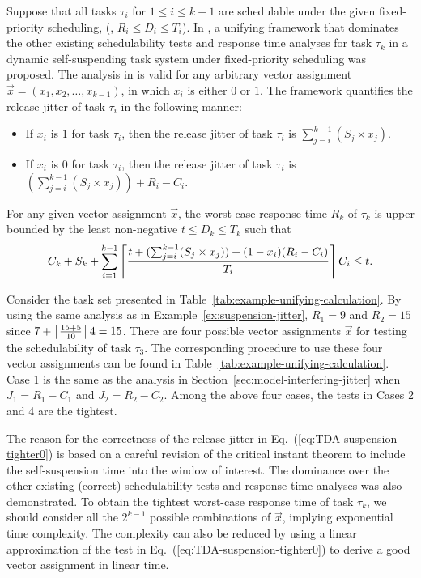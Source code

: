   Suppose that all tasks $\tau_i$ for $1 \leq i \leq k-1$ are
  schedulable under the given fixed-priority scheduling, (\ie, $R_i
  \leq D_i \leq T_i$). In \cite{ChenECRTS2016-suspension}, a unifying framework that dominates the other existing
  schedulability tests and response time analyses for task $\tau_k$ in
  a dynamic self-suspending task system under fixed-priority
  scheduling was proposed. The analysis in \cite{ChenECRTS2016-suspension} is valid
  for any arbitrary vector assignment $\vec{x} = (x_1, x_2, \ldots,
  x_{k-1})$, in which $x_i$ is either $0$ or $1$. The framework
  quantifies the release jitter of task $\tau_i$ in the following
  manner:
  \begin{itemize}
  \item If $x_i$ is $1$ for task $\tau_i$, then the release jitter of
    task $\tau_i$ is $\sum_{j=i}^{k-1} (S_j \times x_j)$. 
  \item If $x_i$ is $0$ for task $\tau_i$, then the release jitter of
    task $\tau_i$ is $(\sum_{j=i}^{k-1} (S_j \times x_j)) + R_i-C_i$. 
  \end{itemize}
  For any given vector assignment $\vec{x}$, the worst-case response
  time $R_k$ of $\tau_k$ is upper bounded by the least non-negative $t
  \leq D_k \leq T_k$ such that
  {\small \begin{equation} \label{eq:TDA-suspension-tighter0} C_k +
      S_k + \sum_{i=1}^{k-1}\left\lceil{\frac{t+ (\sum_{j=i}^{k-1} (S_j
          \times x_j))+(1-x_i)(R_i-C_i)}{T_i}}\right\rceil C_i \leq t.
     \end{equation}}

\begin{example} 
\label{ex:rationale_unifying}  
Consider the task set presented in
Table~\ref{tab:example-unifying-calculation}.  By using the same
analysis as in Example~\ref{ex:suspension-jitter}, $R_1=9$ and
$R_2=15$ since $7+\left\lceil{\frac{15+5}{10}}\right\rceil4 = 15$.  There are four
possible vector assignments $\vec{x}$ for testing the schedulability
of task $\tau_3$. The corresponding procedure to use these four vector
assignments can be found in
Table~\ref{tab:example-unifying-calculation}.  Case 1 is the same as
the analysis in Section~\ref{sec:model-interfering-jitter} when $J_1 =
R_1-C_1$ and $J_2 = R_2-C_2$.  Among the above four cases, the tests
in Cases 2 and 4 are the tightest.
\hfill\myendproof
\end{example}

The reason for the correctness of the release jitter in
Eq.~(\ref{eq:TDA-suspension-tighter0}) is based on a careful revision
of the critical instant theorem to include the self-suspension time
into the window of interest. The dominance over the
other existing (correct) schedulability tests and response time
analyses was also demonstrated. To obtain the tightest worst-case response time of task
$\tau_k$, we should consider all the $2^{k-1}$ possible combinations
of $\vec{x}$, implying exponential time complexity. The complexity can
also be reduced by using a linear approximation of the test in
Eq.~(\ref{eq:TDA-suspension-tighter0}) to derive a good vector
assignment in linear time.


